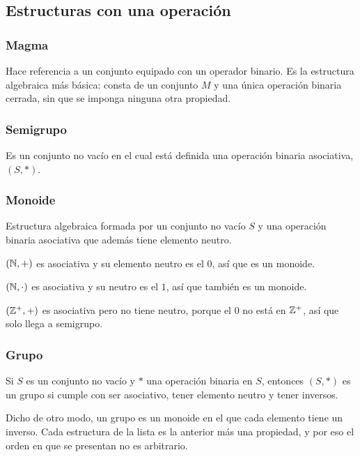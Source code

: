 \documentclass[11pt,letterpaper]{article}
\begin{document}

\subsection*{Estructuras con una operación}

\subsubsection*{Magma}

Hace referencia a un conjunto equipado con un operador binario. Es la
estructura algebraica más básica: consta de un conjunto $M$ y una
única operación binaria cerrada, sin que se imponga ninguna otra
propiedad.

\subsubsection*{Semigrupo}

Es un conjunto no vacío en el cual está definida una operación
binaria asociativa, $(S, *)$.

\subsubsection*{Monoide}

Estructura algebraica formada por un conjunto no vacío $S$ y una
operación binaria asociativa que además tiene elemento neutro.

\begin{ejemplo}
    $(\mathbb{N}, +)$ es asociativa y su elemento neutro es el $0$, así que
    es un monoide.

    $(\mathbb{N}, \cdot)$ es asociativa y su neutro es el $1$, así que
    también es un monoide.

    $(\mathbb{Z}^{+}, +)$ es asociativa pero no tiene neutro, porque el $0$
    no está en $\mathbb{Z}^{+}$, así que solo llega a semigrupo.
\end{ejemplo}

\subsubsection*{Grupo}

Si $S$ es un conjunto no vacío y $*$ una operación binaria en $S$,
entonces $(S, *)$ es un grupo si cumple con ser asociativo, tener
elemento neutro y tener inversos.

\begin{idea}
    Dicho de otro modo, un grupo es un monoide en el que cada
    elemento tiene un inverso. Cada estructura de la lista es la
    anterior más una propiedad, y por eso el orden en que se
    presentan no es arbitrario.
\end{idea}
\end{document}
